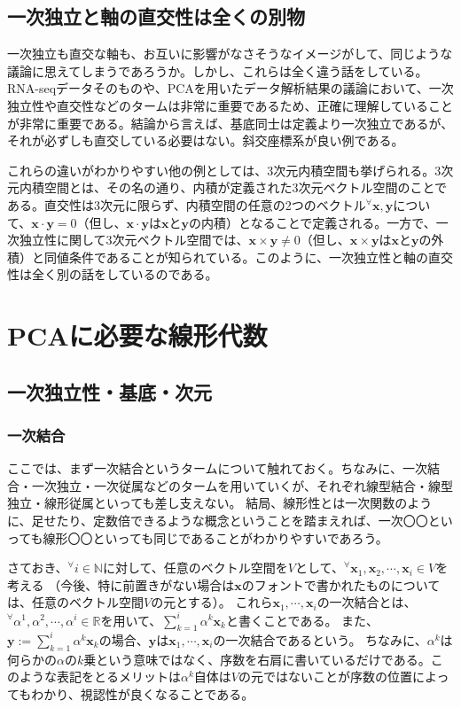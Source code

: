\documentclass[10pt]{ujarticle}
\begin{document}
\subsection{一次独立と軸の直交性は全くの別物}
一次独立も直交な軸も、お互いに影響がなさそうなイメージがして、同じような議論に思えてしまうであろうか。しかし、これらは全く違う話をしている。RNA-seqデータそのものや、PCAを用いたデータ解析結果の議論において、一次独立性や直交性などのタームは非常に重要であるため、正確に理解していることが非常に重要である。結論から言えば、基底同士は定義より一次独立であるが、それが必ずしも直交している必要はない。斜交座標系が良い例である。

これらの違いがわかりやすい他の例としては、3次元内積空間も挙げられる。3次元内積空間とは、その名の通り、内積が定義された3次元ベクトル空間のことである。直交性は3次元に限らず、内積空間の任意の2つのベクトル$^\forall\mathbf{x,y}$について、$\mathbf{x}\cdot\mathbf{y}=0$（但し、$\mathbf{x}\cdot\mathbf{y}$は$\mathbf{x}$と$\mathbf{y}$の内積）となることで定義される。一方で、一次独立性に関して3次元ベクトル空間では、$\mathbf{x}\times\mathbf{y}\neq0$（但し、$\mathbf{x}\times\mathbf{y}$は$\mathbf{x}$と$\mathbf{y}$の外積）と同値条件であることが知られている。このように、一次独立性と軸の直交性は全く別の話をしているのである。

\section{PCAに必要な線形代数}

\hypertarget{bases_and_dim}{\subsection{一次独立性・基底・次元}}
\subsubsection{一次結合}
ここでは、まず一次結合というタームについて触れておく。ちなみに、一次結合・一次独立・一次従属などのタームを用いていくが、それぞれ線型結合・線型独立・線形従属といっても差し支えない。
結局、線形性とは一次関数のように、足せたり、定数倍できるような概念ということを踏まえれば、一次〇〇といっても線形〇〇といっても同じであることがわかりやすいであろう。

さておき、$^\forall i\in\mathbb{N}$に対して、任意のベクトル空間を$V$として、$^\forall\mathbf{x}_1,\mathbf{x}_2,\cdots,\mathbf{x}_i\in V$を考える
（今後、特に前置きがない場合は$\mathbf{x}$のフォントで書かれたものについては、任意のベクトル空間$V$の元とする）。
これら$\mathbf{x}_1,\cdots,\mathbf{x}_i$の一次結合とは、$^\forall\alpha^1,\alpha^2,\cdots,\alpha^i\in\mathbb{R}$を用いて、$\sum_{k=1}^{i}\alpha^k\mathbf{x}_k$と書くことである。
また、$\mathbf{y}:=\sum_{k=1}^{i}\alpha^k\mathbf{x}_k$の場合、$\mathbf{y}$は$\mathbf{x}_1,\cdots,\mathbf{x}_i$の一次結合であるという。
ちなみに、$\alpha^k$は何らかの$\alpha$の$k$乗という意味ではなく、序数を右肩に書いているだけである。このような表記をとるメリットは$\alpha^{k}$自体は$V$の元ではないことが序数の位置によってもわかり、視認性が良くなることである。
\end{document}
